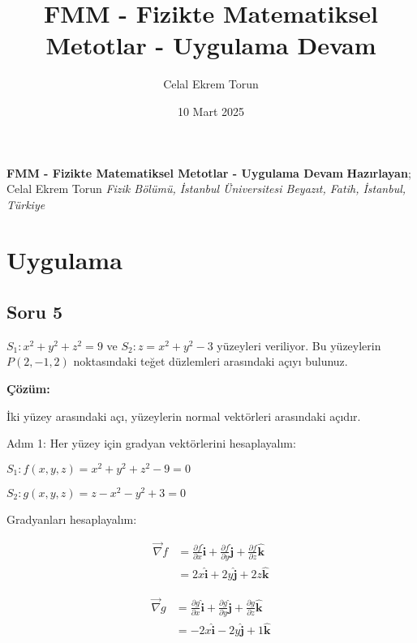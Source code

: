 \documentclass[11pt,letterpaper,twocolumn]{fenbil}
\title{FMM - Fizikte Matematiksel Metotlar - Uygulama Devam}
\author{Celal Ekrem Torun}
\date{10 Mart 2025}
\begin{document}
\begin{minipage}{0.15\textwidth}
{}
\end{minipage}
\hspace{25pt}
\begin{minipage}{0.75\textwidth}
\vspace{5mm}
\Large{\textbf{FMM - Fizikte Matematiksel Metotlar - Uygulama Devam}}
\vspace{3mm}
\large{\textbf{Hazırlayan}; Celal Ekrem Torun}
\vspace{2mm}
\fontsize{0.35cm}{0.5cm}\selectfont \textit{Fizik Bölümü, İstanbul Üniversitesi\newline
Beyazıt, Fatih, İstanbul, Türkiye}
\end{minipage}
\small

\vspace{2mm}
\vspace{2mm}
\vspace{2mm}
\section{Uygulama}

\subsection*{Soru 5}

$S_1: x^2 + y^2 + z^2 = 9$ ve $S_2: z = x^2 + y^2 - 3$ yüzeyleri veriliyor. Bu yüzeylerin $P(2, -1, 2)$ noktasındaki teğet düzlemleri arasındaki açıyı bulunuz.

\textbf{Çözüm:}

İki yüzey arasındaki açı, yüzeylerin normal vektörleri arasındaki açıdır.

Adım 1: Her yüzey için gradyan vektörlerini hesaplayalım:

$S_1: f(x, y, z) = x^2 + y^2 + z^2 - 9 = 0$

$S_2: g(x, y, z) = z - x^2 - y^2 + 3 = 0$

Gradyanları hesaplayalım:

\begin{align}
\vec{\nabla} f &= \frac{\partial f}{\partial x}\hat{\mathbf{i}} + \frac{\partial f}{\partial y}\hat{\mathbf{j}} + \frac{\partial f}{\partial z}\hat{\mathbf{k}} \\
&= 2x\hat{\mathbf{i}} + 2y\hat{\mathbf{j}} + 2z\hat{\mathbf{k}}
\end{align}

\begin{align}
\vec{\nabla} g &= \frac{\partial g}{\partial x}\hat{\mathbf{i}} + \frac{\partial g}{\partial y}\hat{\mathbf{j}} + \frac{\partial g}{\partial z}\hat{\mathbf{k}} \\
&= -2x\hat{\mathbf{i}} - 2y\hat{\mathbf{j}} + 1\hat{\mathbf{k}}
\end{align}
\end{document}
